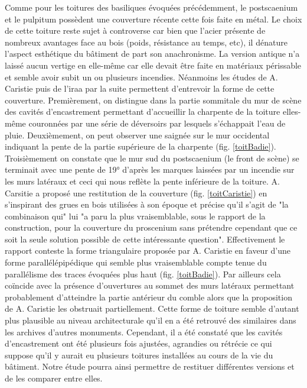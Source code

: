 		Comme pour les toitures des \glspl{basilique} évoquées précédemment, le \gls{postscaenium} et le \gls{pulpitum} possèdent une couverture récente cette fois faite en métal. Le choix de cette toiture reste sujet à controverse car bien que l'acier présente de nombreux avantages face au bois (poids, résistance au temps, etc), il dénature l'aspect esthétique du bâtiment de part son anachronisme. La version antique n'a laissé aucun vertige en elle-même car elle devait être faite en matériaux périssable et semble avoir subit un ou plusieurs incendies. Néanmoins les études de A. Caristie puis de l'\gls{iraa} par la suite permettent d'entrevoir la forme de cette couverture. Premièrement, on distingue dans la partie sommitale du mur de scène des cavités d'encastrement permettant d'accueillir la charpente de la toiture elles-même couronnées par une série de déversoirs par lesquels s’échappait l’eau de pluie. Deuxièmement, on peut observer une saignée sur le mur occidental indiquant la pente de la partie supérieure de la charpente (fig. \ref{toitBadie}). Troisièmement on constate que le mur sud du \gls{postscaenium} (le front de scène) se terminait avec une pente de 19° d'après les marques laissées par un incendie sur les murs latéraux et ceci qui nous reflète la pente inférieure de la toiture. A. Carsitie a proposé une restitution de la couverture (fig. \ref{toitCaristie}) en s'inspirant des grues en bois utilisées à son époque et précise qu'il s'agit de "la combinaison qui" lui "a paru la plus vraisemblable, sous le rapport de la construction, pour la couverture du proscenium sans prétendre cependant que
ce soit la seule solution possible de cette intéressante question". Effectivement le rapport \cite{orangeTxt} conteste la forme triangulaire proposée par A. Caristie en faveur d'une forme parallélépipédique qui semble plus vraisemblable compte tenue du parallélisme des traces évoquées plus haut (fig. \ref{toitBadie}). Par ailleurs cela coïncide avec la présence d'ouvertures au sommet des murs latéraux permettant probablement d'atteindre la partie antérieur du comble alors que la proposition de A. Caristie les obstruait partiellement. Cette forme de toiture semble d'autant plus plausible au niveau architecturale qu'il en a été retrouvé des similaires dans les archives d'autres monuments. Cependant, il a été constaté que les cavités d'encastrement ont été plusieurs fois ajustées, agrandies ou rétrécie ce qui suppose qu'il y aurait eu plusieurs toitures installées au cours de la vie du bâtiment. Notre étude pourra ainsi permettre de restituer différentes versions et de les comparer entre elles.
		
